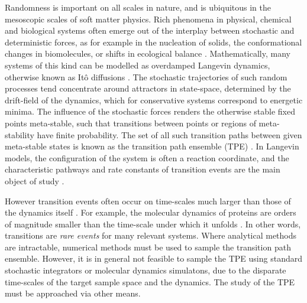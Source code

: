 \documentclass[]{cam-thesis}
\begin{document}
Randomness is important on all scales in nature, and is ubiquitous in the mesoscopic scales of soft matter physics. Rich phenomena in physical, chemical and biological systems often emerge out of the interplay between stochastic and deterministic forces, as for example in the nucleation of solids, the conformational changes in biomolecules, or shifts in ecological balance \citep{faccioliDominantPathwaysProtein2006a, demarcoPhaseTransitionModel2001a, gardnerConstructionGeneticToggle2000a, mangelBarrierTransitionsDriven1994a, wolynesNavigatingFoldingRoutes1995a, huangMolecularMathematicalBasis2012a, paninskiMostLikelyVoltage2006a, noltingBallsCupsQuasipotentials2016a, leeFindingMultipleReaction2017a}. Mathematically, many systems of this kind can be modelled as overdamped Langevin dynamics, otherwise known as It\^{o} diffusions \citep{kampenStochasticProcessesPhysics2011a, gardinerStochasticMethodsHandbook2010a, riskenFokkerPlanckEquationMethods2012a, bharucha-reidElementsTheoryMarkov2012a}. The stochastic trajectories of such random processes tend concentrate around attractors in state-space, determined by the drift-field of the dynamics, which for conservative systems correspond to energetic minima. The influence of the stochastic forces renders the otherwise stable fixed points meta-stable, such that transitions between points or regions of meta-stability have finite probability. The set of all such transition paths between given meta-stable states is known as the transition path ensemble (TPE) \citep{bolhuisTransitionPathSampling2002a}. In Langevin models, the configuration of the system is often a reaction coordinate, and the characteristic pathways and rate constants of transition events are the main object of study \citep{dellagoCalculationReactionRate1999a, arjunUnbiasedAtomisticInsight2019, geisslerAutoionizationLiquidWater2001, carterConstrainedReactionCoordinate1989, laioEscapingFreeenergyMinima2002, bestMicroscopicInterpretationFolding2016, arjunUnbiasedAtomisticInsight2019}.

However transition events often occur on time-scales much larger than those of the dynamics itself \citep{petersReactionRateTheory2017, bolhuisTransitionPathSamplinga, grafkeLongTermEffects2017}. For example, the molecular dynamics of proteins are orders of magnitude smaller than the time-scale under which it unfolds \citep{veitshansProteinFoldingKinetics1997a}. In other words, transitions are \textit{rare events} for many relevant systems. Where analytical methods are intractable, numerical methods must be used to sample the transition path ensemble. However, it is in general not feasible to sample the TPE using standard stochastic integrators or molecular dynamics simulatons, due to the disparate time-scales of the target sample space and the dynamics. The study of the TPE must be approached via other means.
\end{document}
